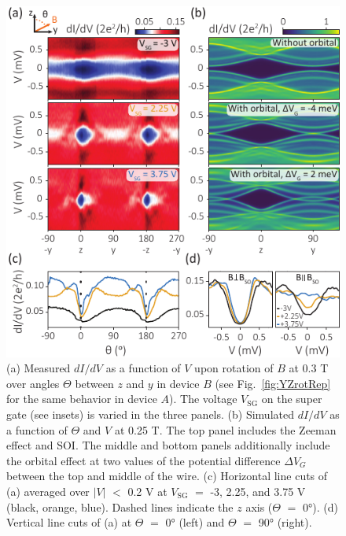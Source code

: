 \begin{figure}
\begin{center}
\includegraphics[width=0.7\columnwidth]{chapter_spinorbit/figures/Fig3.pdf}
\caption{\label{fig:fig3}
(a) Measured $dI/dV$ as a function of $V$ upon rotation of $B$ at 0.3 T over angles $\Theta$ between $z$ and $y$ in device $B$ (see Fig.~\ref{fig:YZrotRep} for the same behavior in device $A$).
The voltage $V_{\mathrm{SG}}$ on the super gate (see insets) is varied in the three panels.
(b) Simulated $dI/dV$ as a function of $\Theta$ and $V$ at 0.25 T.
The top panel includes the Zeeman effect and SOI.
The middle and bottom panels additionally include the orbital effect at two values of the potential difference $\Delta V_G$ between the top and middle of the wire.
(c) Horizontal line cuts of (a) averaged over $|V|$ $<$ 0.2 V at $V_{\mathrm{SG}}$ $=$ -3,  2.25, and 3.75 V (black, orange, blue).
Dashed lines indicate the $z$ axis ($\Theta$ $=$ \ang{0}).
(d) Vertical line cuts of (a) at $\Theta$ $=$ \ang{0} (left) and $\Theta$ $=$ \ang{90} (right).
}
\end{center}
\end{figure}

